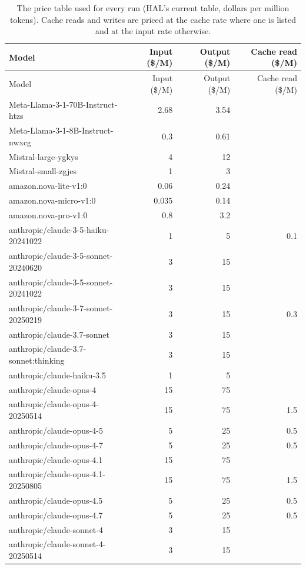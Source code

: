 \begin{longtable}{lrrr}
\caption{The price table used for every run (HAL's current table, dollars per million tokens). Cache reads and writes are priced at the cache rate where one is listed and at the input rate otherwise.}\label{tab:supp-prices}\\
\toprule
Model & Input (\$/M) & Output (\$/M) & Cache read (\$/M) \\
\midrule
\endfirsthead
\toprule
Model & Input (\$/M) & Output (\$/M) & Cache read (\$/M) \\
\midrule
\endhead
\bottomrule
\endfoot
Meta-Llama-3-1-70B-Instruct-htzs & 2.68 & 3.54 &  \\
Meta-Llama-3-1-8B-Instruct-nwxcg & 0.3 & 0.61 &  \\
Mistral-large-ygkys & 4 & 12 &  \\
Mistral-small-zgjes & 1 & 3 &  \\
amazon.nova-lite-v1:0 & 0.06 & 0.24 &  \\
amazon.nova-micro-v1:0 & 0.035 & 0.14 &  \\
amazon.nova-pro-v1:0 & 0.8 & 3.2 &  \\
anthropic/claude-3-5-haiku-20241022 & 1 & 5 & 0.1 \\
anthropic/claude-3-5-sonnet-20240620 & 3 & 15 &  \\
anthropic/claude-3-5-sonnet-20241022 & 3 & 15 &  \\
anthropic/claude-3-7-sonnet-20250219 & 3 & 15 & 0.3 \\
anthropic/claude-3.7-sonnet & 3 & 15 &  \\
anthropic/claude-3.7-sonnet:thinking & 3 & 15 &  \\
anthropic/claude-haiku-3.5 & 1 & 5 &  \\
anthropic/claude-opus-4 & 15 & 75 &  \\
anthropic/claude-opus-4-20250514 & 15 & 75 & 1.5 \\
anthropic/claude-opus-4-5 & 5 & 25 & 0.5 \\
anthropic/claude-opus-4-7 & 5 & 25 & 0.5 \\
anthropic/claude-opus-4.1 & 15 & 75 &  \\
anthropic/claude-opus-4.1-20250805 & 15 & 75 & 1.5 \\
anthropic/claude-opus-4.5 & 5 & 25 & 0.5 \\
anthropic/claude-opus-4.7 & 5 & 25 & 0.5 \\
anthropic/claude-sonnet-4 & 3 & 15 &  \\
anthropic/claude-sonnet-4-20250514 & 3 & 15 &  \\

\end{longtable}
